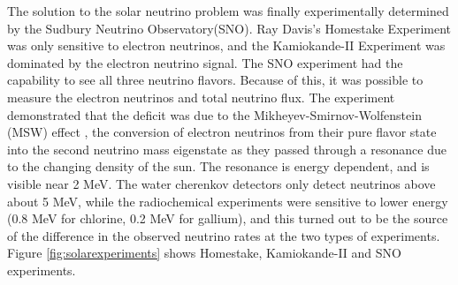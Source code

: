 The solution to the solar neutrino problem was finally experimentally determined by the Sudbury Neutrino Observatory(SNO). Ray Davis's Homestake Experiment was only sensitive to electron neutrinos, and the Kamiokande-II Experiment was dominated by the electron neutrino signal. The SNO experiment had the capability to see all three neutrino flavors. Because of this, it was possible to measure the electron neutrinos and total neutrino flux. The experiment demonstrated that the deficit was due to the Mikheyev-Smirnov-Wolfenstein (MSW) effect \cite{Smirnov:2003da}, the conversion of electron neutrinos from their pure flavor state into the second neutrino mass eigenstate as they passed through a resonance due to the changing density of the sun. The resonance is energy dependent, and is visible near 2 MeV. The water cherenkov detectors only detect neutrinos above about 5 MeV, while the radiochemical experiments were sensitive to lower energy (0.8 MeV for chlorine, 0.2 MeV for gallium), and this turned out to be the source of the difference in the observed neutrino rates at the two types of experiments. Figure \ref{fig:solarexperiments} shows Homestake, Kamiokande-II and SNO experiments. 
